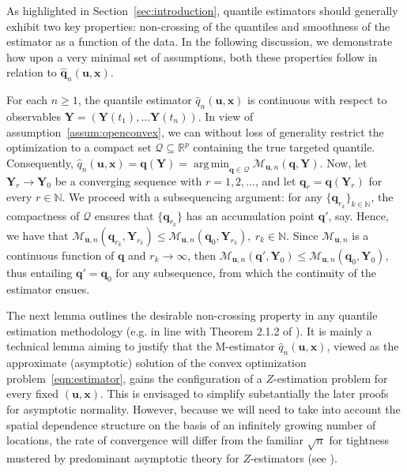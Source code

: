 \documentclass[aos]{imsart}
\theoremstyle{plain}
\theoremstyle{remark}
\def\R{\mathbb{R}}
\def\N{\mathbb{N}}
\DeclareMathOperator*{\argmin}{arg\,min}
\newcommand{\bb}[1]{\boldsymbol{#1}}
\newcommand{\cnam}[1]{\textcolor{mypurple}{#1}}
\begin{document}
As \cnam{highlighted in Section~\ref{sec:introduction}, quantile estimators should generally exhibit two key properties: non-crossing of the quantiles and smoothness of the estimator as a function of the data.} In the following discussion, we demonstrate how upon a very minimal set of assumptions, both these properties follow in relation to $\widehat{\bb{q}}_n(\bb{u}, \bb{x})$.

For each $n \geqslant 1$, the quantile estimator $\hat{q}_n(\bb{u} ,\bb{x})$ is continuous with respect to observables $\bb{Y} = \left(\bb{Y}(t_1), \dots \bb{Y}(t_n)\right)$. In view of assumption~\ref{assum:openconvex}, we can without loss of generality restrict the optimization to a compact set $\mathcal{Q} \subseteq \R^p$ containing the true targeted quantile. Consequently, $\hat{q}_n(\bb{u} ,\bb{x}) = \bb{q}(\bb{Y}) = \argmin_{\bb{q} \in \mathcal{Q}} \mathcal{M}_{\bb{u},n} (\bb{q}, \bb{Y})$. Now, let $\bb{Y}_r \rightarrow \bb{Y}_0$ be a converging sequence with $r = 1, 2, \dots$, and let $\bb{q}_r = \bb{q}(\bb{Y}_r)$ for every $r \in \N$. We proceed with a subsequencing argument: for any $\{ \bb{q}_{r_k} \}_{k \in \mathbb{N}}$, the compactness of $\mathcal{Q}$ ensures that $\{ \bb{q}_{r_k} \}$ has an accumulation point $\bb{q}'$, say. Hence, we have that $\mathcal{M}_{\bb{u},n}(\bb{q}_{r_k}, \bb{Y}_{r_k}) \leqslant  \mathcal{M}_{\bb{u},n}(\bb{q}_0, \bb{Y}_{r_k}), \ r_k \in \N$. Since $ \mathcal{M}_{\bb{u},n}$ is a continuous function of $\bb{q}$ and $r_k \rightarrow \infty$, then $ \mathcal{M}_{\bb{u},n}(\bb{q}', \bb{Y}_0) \leqslant  \mathcal{M}_{\bb{u},n}(\bb{q}_0, \bb{Y}_0)$, thus entailing $\bb{q}' = \bb{q}_0$ for any subsequence, from which the continuity of the estimator ensues.

The next lemma outlines the desirable non-crossing property in any quantile estimation methodology (e.g. in line with Theorem 2.1.2 of \cite{chaudhuri1996geometric}). It is mainly a technical lemma aiming to justify that the M-estimator $\hat{q}_n(\bb{u} ,\bb{x})$, viewed as the approximate (asymptotic) solution of the convex optimization problem~\eqref{eqn:estimator}, gains the configuration of a $Z$-estimation problem for every fixed $(\bb{u} ,\bb{x})$. This is envisaged to simplify substantially the later proofs for asymptotic normality. However, because we will need to take into account the spatial dependence structure on the basis of an infinitely growing number of locations, the rate of convergence will differ from the familiar $\sqrt{n}$ for tightness mustered by predominant asymptotic theory for $Z$-estimators (see \citet{VanderVaart1998,Kosorok2008}).
\end{document}
